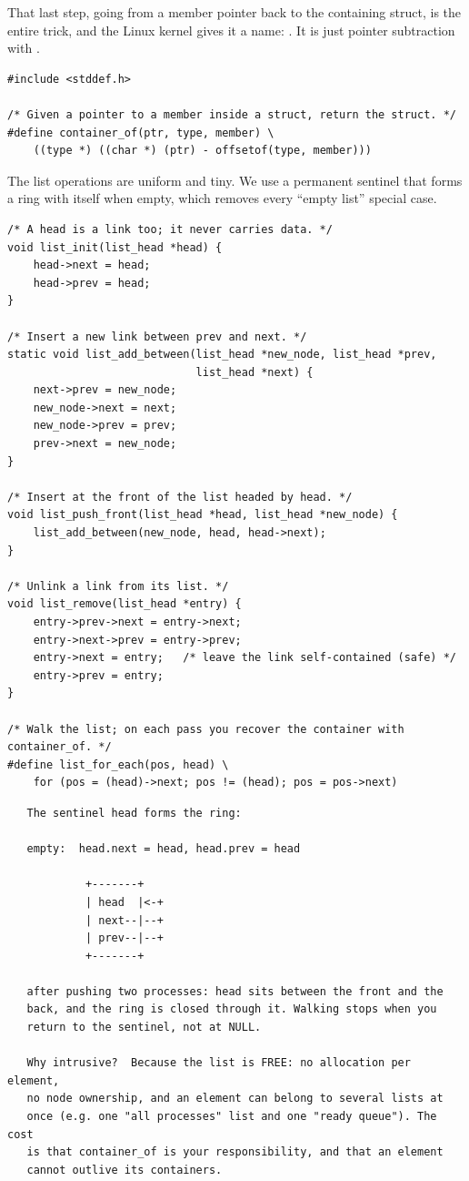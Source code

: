 That last step, going from a member pointer back to the containing
struct, is the entire trick, and the Linux kernel gives it a name:
. It is just pointer subtraction with
.

\begin{lstlisting}[caption={container\_of: from a member back to its container.}]
#include <stddef.h>

/* Given a pointer to a member inside a struct, return the struct. */
#define container_of(ptr, type, member) \
    ((type *) ((char *) (ptr) - offsetof(type, member)))
\end{lstlisting}

The list operations are uniform and tiny. We use a permanent sentinel
\code{head} that forms a ring with itself when empty, which removes
every ``empty list'' special case.

\begin{lstlisting}[caption={Circular intrusive list with a sentinel head.}]
/* A head is a link too; it never carries data. */
void list_init(list_head *head) {
    head->next = head;
    head->prev = head;
}

/* Insert a new link between prev and next. */
static void list_add_between(list_head *new_node, list_head *prev,
                             list_head *next) {
    next->prev = new_node;
    new_node->next = next;
    new_node->prev = prev;
    prev->next = new_node;
}

/* Insert at the front of the list headed by head. */
void list_push_front(list_head *head, list_head *new_node) {
    list_add_between(new_node, head, head->next);
}

/* Unlink a link from its list. */
void list_remove(list_head *entry) {
    entry->prev->next = entry->next;
    entry->next->prev = entry->prev;
    entry->next = entry;   /* leave the link self-contained (safe) */
    entry->prev = entry;
}

/* Walk the list; on each pass you recover the container with container_of. */
#define list_for_each(pos, head) \
    for (pos = (head)->next; pos != (head); pos = pos->next)
\end{lstlisting}

\begin{verbatim}
   The sentinel head forms the ring:

   empty:  head.next = head, head.prev = head

            +-------+
            | head  |<-+
            | next--|--+
            | prev--|--+
            +-------+

   after pushing two processes: head sits between the front and the
   back, and the ring is closed through it. Walking stops when you
   return to the sentinel, not at NULL.

   Why intrusive?  Because the list is FREE: no allocation per element,
   no node ownership, and an element can belong to several lists at
   once (e.g. one "all processes" list and one "ready queue"). The cost
   is that container_of is your responsibility, and that an element
   cannot outlive its containers.
\end{verbatim}

